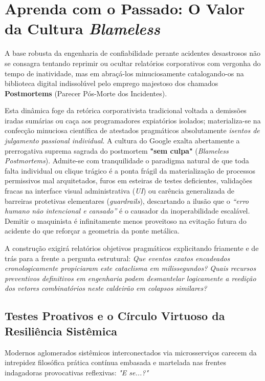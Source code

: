 \documentclass[12pt,a4paper]{report}
\begin{document}
\section{Aprenda com o Passado: O Valor da Cultura \textit{Blameless}}

A base robusta da engenharia de confiabilidade perante acidentes desastrosos não se consagra tentando reprimir ou ocultar relatórios corporativos com vergonha do tempo de inatividade, mas em abraçá-los minuciosamente catalogando-os na biblioteca digital indissolúvel pelo emprego majestoso dos chamados \textbf{Postmortems} (Parecer Pós-Morte dos Incidentes). 

Esta dinâmica foge da retórica corporativista tradicional voltada a demissões iradas sumárias ou caça aos programadores expiatórios isolados; materializa-se na confecção minuciosa científica de atestados pragmáticos absolutamente \textit{isentos de julgamento passional individual}. A cultura do Google exalta abertamente a prerrogativa suprema sagrada do postmortem \textbf{"sem culpa"} (\textit{Blameless Postmortems}). Admite-se com tranquilidade o paradigma natural de que toda falta individual ou clique trágico é a ponta frágil da materialização de processos permissivos mal arquitetados, furos em esteiras de testes deficientes, validações fracas na interface visual administrativa (\textit{UI}) ou carência generalizada de barreiras protetivas elementares (\textit{guardrails}), descartando a ilusão que o \textit{“erro humano não intencional e cansado”} é o causador da inoperabilidade escalável. Demitir o maquinista é infinitamente menos proveitoso na evitação futura do acidente do que reforçar a geometria da ponte metálica.

A construção exigirá relatórios objetivos pragmáticos explicitando friamente e de trás para a frente a pergunta estrutural: \textit{Que eventos exatos encadeados cronologicamente propiciaram este cataclisma em milissegundos? Quais recursos preventivos definitivos em engenharia podem desmantelar logicamente a reedição dos vetores combinatórios neste caldeirão em colapsos similares?}

\subsection{Testes Proativos e o Círculo Virtuoso da Resiliência Sistêmica}

Modernos aglomerados sistêmicos interconectados via microsserviços carecem da intrepidez filosófica prática contínua embasada e martelada nas frentes indagadoras provocativas reflexivas: \textit{"E se...?"}
\end{document}
